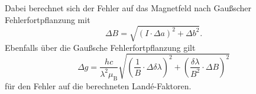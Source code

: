  Dabei berechnet sich der Fehler auf das Magnetfeld nach Gaußscher Fehlerfortpflanzung mit
 \begin{equation}
     \Delta B = \sqrt{(I\cdot \Delta a)^2 + \Delta b^2} .
 \end{equation}
 Ebenfalls über die Gaußsche Fehlerfortpflanzung gilt
 \begin{equation}
    \Delta g = \frac{hc}{\lambda^2 \mu_\text{B}} \sqrt{(\frac{1}{B} \cdot \Delta \delta \lambda)^2 + (\frac{\delta \lambda}{B^2}\cdot \Delta B)^2}
 \end{equation} \noindent
 für den Fehler auf die berechneten Landé-Faktoren.
